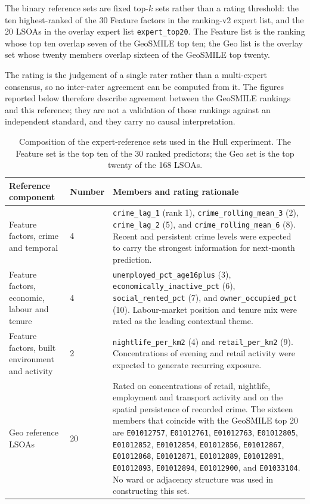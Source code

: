The binary reference sets are fixed top-$k$ sets rather than a rating threshold: the ten highest-ranked of the 30 Feature factors in the ranking-v2 expert list, and the 20 LSOAs in the overlay expert list \texttt{expert\_top20}. The Feature list is the ranking whose top ten overlap seven of the GeoSMILE top ten; the Geo list is the overlay set whose twenty members overlap sixteen of the GeoSMILE top twenty.

The rating is the judgement of a single rater rather than a multi-expert consensus, so no inter-rater agreement can be computed from it. The figures reported below therefore describe agreement between the GeoSMILE rankings and this reference; they are not a validation of those rankings against an independent standard, and they carry no causal interpretation.

\begin{table}[H]
\centering
\caption{Composition of the expert-reference sets used in the Hull experiment.
The Feature set is the top ten of the 30 ranked predictors; the Geo set is the top
twenty of the 168 LSOAs.}
\label{tab:hull_ground_truth_design}
\small
\begin{tabularx}{\textwidth}
{p{} p{} X}
\toprule
Reference component & Number & Members and rating rationale \\
\midrule
Feature factors, crime and temporal & 4 &
\texttt{crime\_lag\_1} (rank 1),
\texttt{crime\_rolling\_mean\_3} (2),
\texttt{crime\_lag\_2} (5), and
\texttt{crime\_rolling\_mean\_6} (8). Recent and persistent crime levels were expected to carry the strongest information for next-month prediction. \\
Feature factors, economic, labour and tenure & 4 &
\texttt{unemployed\_pct\_age16plus} (3),
\texttt{economically\_inactive\_pct} (6),
\texttt{social\_rented\_pct} (7), and
\texttt{owner\_occupied\_pct} (10). Labour-market position and tenure mix were rated as the leading contextual theme. \\
Feature factors, built environment and activity & 2 &
\texttt{nightlife\_per\_km2} (4) and
\texttt{retail\_per\_km2} (9). Concentrations of evening and retail activity were expected to generate recurring exposure. \\
Geo reference LSOAs & 20 &
Rated on concentrations of retail, nightlife, employment and transport activity and on the spatial persistence of recorded crime. The sixteen members that coincide with the GeoSMILE top 20 are
\texttt{E01012757},
\texttt{E01012761},
\texttt{E01012763},
\texttt{E01012805},
\texttt{E01012852},
\texttt{E01012854},
\texttt{E01012856},
\texttt{E01012867},
\texttt{E01012868},
\texttt{E01012871},
\texttt{E01012889},
\texttt{E01012891},
\texttt{E01012893},
\texttt{E01012894},
\texttt{E01012900}, and
\texttt{E01033104}. No ward or adjacency structure was used in constructing this set. \\
\bottomrule
\end{tabularx}
\end{table}

